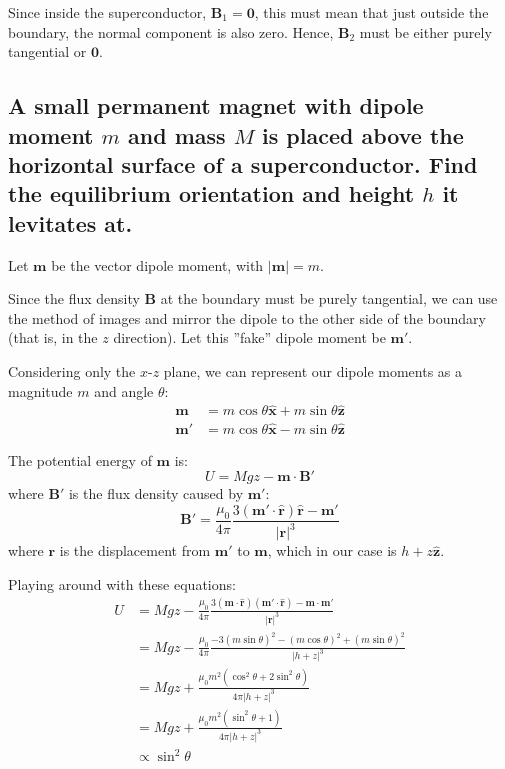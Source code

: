 \documentclass[a4paper]{scrartcl}
\begin{document}
Since inside the superconductor, \(\mathbf{B}_1 = \mathbf{0}\), this must mean that just outside the boundary, the normal component is also zero. Hence, \(\mathbf{B}_2\) must be either purely tangential or \(\mathbf{0}\).

\subsection{A small permanent magnet with dipole moment \(m\) and mass \(M\) is placed above the horizontal surface of a superconductor. Find the equilibrium orientation and height \(h\) it levitates at.}
Let \(\mathbf{m}\) be the vector dipole moment, with \(|\mathbf{m}| = m\).

Since the flux density \(\mathbf{B}\) at the boundary must be purely tangential, we can use the method of images and mirror the dipole to the other side of the boundary (that is, in the \(z\) direction). Let this ''fake'' dipole moment be \(\mathbf{m}'\).

Considering only the \(x\)-\(z\) plane, we can represent our dipole moments as a magnitude \(m\) and angle \(\theta\):
\begin{align*}
    \mathbf{m} &= m \cos \theta \hat{\mathbf{x}} + m \sin \theta \hat{\mathbf{z}} \\
    \mathbf{m}' &= m \cos \theta \hat{\mathbf{x}} - m \sin \theta \hat{\mathbf{z}}
\end{align*}

The potential energy of \(\mathbf{m}\) is:
\[U = M g z - \mathbf{m} \cdot \mathbf{B}'\]
where \(\mathbf{B}'\) is the flux density caused by \(\mathbf{m}'\):
\[\mathbf{B}' = \frac{\mu_0}{4 \pi} \frac{3 (\mathbf{m}' \cdot \hat{\mathbf{r}}) \hat{\mathbf{r}} - \mathbf{m}'}{|\mathbf{r}|^3}\]
where \(\mathbf{r}\) is the displacement from \(\mathbf{m}'\) to \(\mathbf{m}\), which in our case is \(h + z \hat{\mathbf{z}}\).

Playing around with these equations:
\begin{align*}
    U &= M g z - \frac{\mu_0}{4 \pi} \frac{3 (\mathbf{m} \cdot \hat{\mathbf{r}}) (\mathbf{m}' \cdot \hat{\mathbf{r}}) - \mathbf{m} \cdot \mathbf{m}'}{|\mathbf{r}|^3} \\
    &= M g z - \frac{\mu_0}{4 \pi} \frac{-3 (m \sin \theta)^2 - (m \cos \theta)^2 + (m \sin \theta)^2}{|h + z|^3} \\
    &= M g z + \frac{\mu_0 m^2 (\cos^2 \theta + 2 \sin^2 \theta)}{4 \pi |h + z|^3} \\
    &= M g z + \frac{\mu_0 m^2 (\sin^2 \theta + 1)}{4 \pi |h + z|^3} \\
    &\propto \sin^2 \theta
\end{align*}
\end{document}
